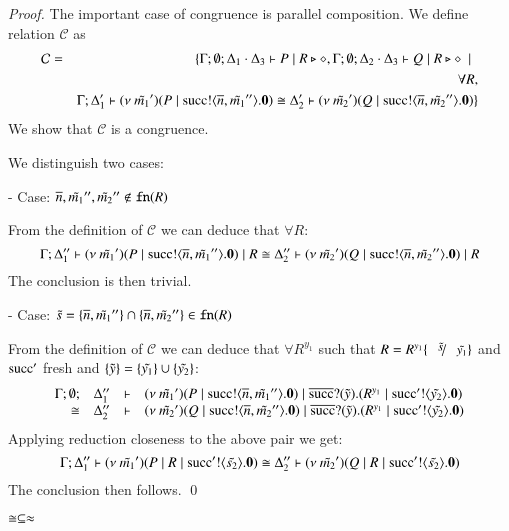 \begin{proof}
	The important case of congruence is parallel composition.
	We define relation $\mathcal{C}$ as
%
	\begin{eqnarray*}
		\mathcal{C} &=&	\{ \Gamma; \emptyset; \Delta_1 \cdot \Delta_3 \vdash P \;|\; R \triangleright \diamond,  \Gamma; \emptyset; \Delta_2 \cdot \Delta_3 \vdash Q \;|\; R \triangleright \diamond \ \ |\ \  \\
		& &	\forall R,\\
		& &	\Gamma; \Delta_1' \vdash (\nu\ \tilde{m_1}')(P \;|\; \textrm{succ} ! \langle \overline{n}, \tilde{m_1}'' \rangle . \mathbf{0}) \cong \Delta_2' \vdash (\nu\ \tilde{m_2}')(Q \;|\; \textrm{succ} ! \langle \overline{n}, \tilde{m_2}'' \rangle . \mathbf{0})\}
	\end{eqnarray*}
%
	\noi We show that $\mathcal{C}$ is a congruence.

	\noi We distinguish two cases:

	\noi - Case: $\overline{n}, \tilde{m_1}'', \tilde{m_2}'' \notin \mathtt{fn}(R)$	

	\noi From the definition of $\mathcal{C}$ we can deduce that $\forall R$:
%
	\[
		\Gamma; \Delta_1'' \vdash (\nu\ \tilde{m_1}')(P \;|\; \textrm{succ} ! \langle \overline{n}, \tilde{m_1}'' \rangle . \mathbf{0}) \;|\; R \cong \Delta_2'' \vdash (\nu\ \tilde{m_2}')(Q \;|\; \textrm{succ} ! \langle \overline{n}, \tilde{m_2}'' \rangle . \mathbf{0}) \;|\; R
	\]
	\noi The conclusion is then trivial.

	\noi - Case: $\tilde{s} = \{\overline{n}, \tilde{m_1}''\} \cap \{\overline{n}, \tilde{m_2}''\} \in \mathtt{fn}(R)$

	\noi From the definition of $\mathcal{C}$ we can deduce that $\forall R^{y_1}$ such that $R = R^{y_1}\subst{\tilde{s}}{\tilde{y_1}}$
	and $\textrm{succ}'$ fresh and $\{\tilde{y}\} = \{\tilde{y_1}\} \cup \{\tilde{y_2}\}$:
%
	\[
		\begin{array}{rcll} \Gamma; \emptyset; &\Delta_1''& \vdash& (\nu\ \tilde{m_1}')(P \;|\; \textrm{succ} ! \langle \overline{n}, \tilde{m_1}'' \rangle . \mathbf{0}) \;|\; \overline{\textrm{succ}} ? (\tilde{y}) . (R^{y_1} \;|\; \textrm{succ}' ! \langle \tilde{y_2} \rangle . \mathbf{0})\\ \cong &\Delta_2''& \vdash &  (\nu\ \tilde{m_2}')(Q \;|\; \textrm{succ} ! \langle \overline{n}, \tilde{m_2}'' \rangle . \mathbf{0}) \;|\; \overline{\textrm{succ}} ? (\tilde{y}) . (R^{y_1} \;|\; \textrm{succ}' ! \langle \tilde{y_2} \rangle . \mathbf{0}) \end{array}
	\]
%
	\noi Applying reduction closeness to the above pair we get:
%
	\[
		\Gamma; \Delta_1'' \vdash (\nu\ \tilde{m_1}')(P \;|\; R \;|\; \textrm{succ}' ! \langle \tilde{s_2} \rangle . \mathbf{0}) \cong \Delta_2'' \vdash (\nu\ \tilde{m_2}')(Q \;|\; R \;|\; \textrm{succ}' ! \langle \tilde{s_2} \rangle . \mathbf{0})
	\]
%
	\noi The conclusion then follows.
	\qed
\end{proof}


\begin{lemma}\rm
	\label{lem:cong_is_wb}
	$\cong \subseteq \approx$
\end{lemma}

